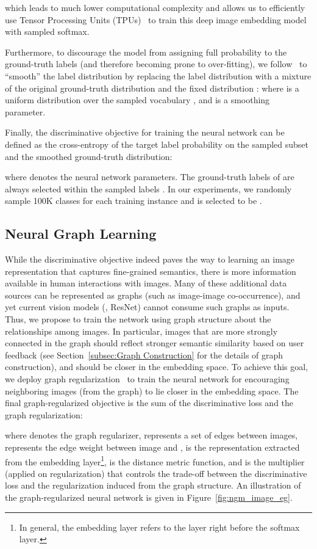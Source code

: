 \documentclass[sigconf]{acmart}
\begin{document}
which leads to much lower computational complexity and allows us to efficiently use Tensor Processing Units (TPUs)~\cite{jouppi2017datacenter} to train this deep image embedding model with sampled softmax.

Furthermore, to discourage the model from assigning full probability to the ground-truth labels (and therefore becoming prone to over-fitting), we follow~\cite{szegedy2016rethinking} to ``smooth'' the label distribution by replacing the label distribution with a mixture of the original ground-truth distribution  and the fixed distribution : 
\label{eq:label_smoothing}
where  is a uniform distribution over the sampled vocabulary , and  is a smoothing parameter.

Finally, the discriminative objective for training the neural network can be defined as the cross-entropy of the target label probability on the sampled subset and the smoothed ground-truth distribution: 

where  denotes the neural network parameters. The ground-truth labels of  are always selected within the sampled labels . In our experiments, we randomly sample 100K classes for each training instance and  is selected to be .

\subsection{Neural Graph Learning}\label{subsec:Neural Graph Learning}
While the discriminative objective indeed paves the way to learning an image representation that captures fine-grained semantics, there is more information available in human interactions with images. Many of these additional data sources can be represented as graphs (such as image-image co-occurrence), and yet current vision models (\eg, ResNet) cannot consume such graphs as inputs. Thus, we propose to train the network using graph structure about the relationships among images. In particular, images that are more strongly connected in the graph should reflect stronger semantic similarity based on user feedback (see Section~\ref{subsec:Graph Construction} for the details of graph construction), and should be closer in the embedding space. To achieve this goal, we deploy graph regularization~\cite{bui2018neural} to train the neural network for encouraging neighboring images (from the graph) to lie closer in the embedding space. 
The final graph-regularized objective is the sum of the discriminative loss and the graph regularization:

\noindent where  denotes the graph regularizer,  represents a set of edges between images,  represents the edge weight between image  and ,  is the representation extracted from the embedding layer\footnote{In general, the embedding layer refers to the layer right before the softmax layer.},  is the distance metric function, and  is the multiplier (applied on regularization) that controls the trade-off between the discriminative loss and the regularization induced from the graph structure. An illustration of the graph-regularized neural network is given in Figure~\ref{fig:ngm_image_eg}.
\end{document}
